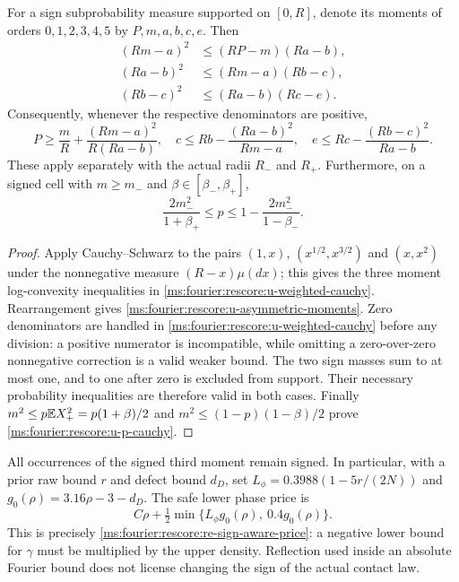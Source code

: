 \begin{lemma}\label{ms:fourier:rescore:u-asymmetric}
For a sign subprobability measure supported on $[0,R]$, denote its
moments of orders $0,1,2,3,4,5$ by $P,m,a,b,c,e$.  Then
\begin{align}\label{ms:fourier:rescore:u-weighted-cauchy}
 (Rm-a)^2&\le(RP-m)(Ra-b),\nonumber\\
 (Ra-b)^2&\le(Rm-a)(Rb-c),\\
 (Rb-c)^2&\le(Ra-b)(Rc-e).\nonumber
\end{align}
Consequently, whenever the respective denominators are positive,
\begin{equation}\label{ms:fourier:rescore:u-asymmetric-moments}
 P\ge\frac mR+\frac{(Rm-a)^2}{R(Ra-b)},\quad
 c\le Rb-\frac{(Ra-b)^2}{Rm-a},\quad
 e\le Rc-\frac{(Rb-c)^2}{Ra-b}.
\end{equation}
These apply separately with the actual radii $R_-$ and $R_+$.
Furthermore, on a signed cell with $m\ge m_-$ and
$\beta\in[\beta_-,\beta_+]$,
\begin{equation}\label{ms:fourier:rescore:u-p-cauchy}
 \frac{2m_-^2}{1+\beta_+}\le p\le
 1-\frac{2m_-^2}{1-\beta_-}.
\end{equation}
\end{lemma}
\begin{proof}
Apply Cauchy--Schwarz to the pairs $(1,x)$, $(x^{1/2},x^{3/2})$
and $(x,x^2)$ under the nonnegative measure $(R-x)\mu(dx)$;
this gives the three
moment log-convexity inequalities in \eqref{ms:fourier:rescore:u-weighted-cauchy}.
Rearrangement gives \eqref{ms:fourier:rescore:u-asymmetric-moments}.
Zero denominators are handled in \eqref{ms:fourier:rescore:u-weighted-cauchy} before any
division: a positive numerator is incompatible, while omitting a
zero-over-zero nonnegative correction is a valid weaker bound.
The two sign masses sum to at most one, and to one after zero is
excluded from support.  Their necessary probability inequalities are
therefore valid in both cases.  Finally
$m^2\le p\mathbb E X_+^2=p(1+\beta)/2$ and
$m^2\le(1-p)(1-\beta)/2$ prove \eqref{ms:fourier:rescore:u-p-cauchy}.
\end{proof}

All occurrences of the signed third moment remain signed.  In particular,
with a prior raw bound $r$ and defect bound $d_D$, set
$L_\phi=0.3988(1-5r/(2N))$ and $g_0(\rho)=3.16\rho-3-d_D$.
The safe lower phase price is
\begin{equation}\label{ms:fourier:rescore:u-signed-price}
 C\rho+\tfrac12\min\{L_\phi g_0(\rho),\ 0.4g_0(\rho)\}.
\end{equation}
This is precisely \eqref{ms:fourier:rescore:re-sign-aware-price}:
a negative lower bound for $\gamma$ must be multiplied by the upper
density.  Reflection used inside an absolute Fourier bound does not
license changing the sign of the actual contact law.

